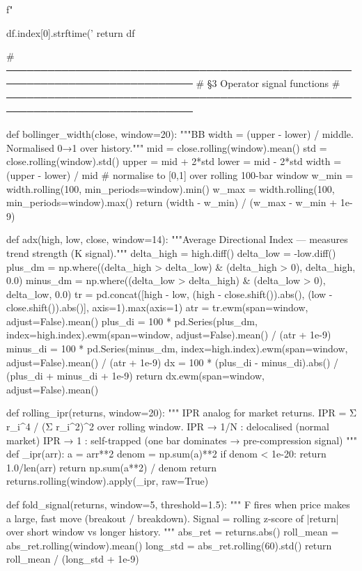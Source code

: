           f"{df.index[0].strftime('%
    return df

# ─────────────────────────────────────────────────────────────────────────────
# §3  Operator signal functions
# ─────────────────────────────────────────────────────────────────────────────

def bollinger_width(close, window=20):
    """BB width = (upper - lower) / middle. Normalised 0→1 over history."""
    mid  = close.rolling(window).mean()
    std  = close.rolling(window).std()
    upper = mid + 2*std
    lower = mid - 2*std
    width = (upper - lower) / mid
    # normalise to [0,1] over rolling 100-bar window
    w_min = width.rolling(100, min_periods=window).min()
    w_max = width.rolling(100, min_periods=window).max()
    return (width - w_min) / (w_max - w_min + 1e-9)

def adx(high, low, close, window=14):
    """Average Directional Index — measures trend strength (K signal)."""
    delta_high = high.diff()
    delta_low  = -low.diff()
    plus_dm  = np.where((delta_high > delta_low) & (delta_high > 0), delta_high, 0.0)
    minus_dm = np.where((delta_low > delta_high) & (delta_low > 0), delta_low,  0.0)
    tr = pd.concat([high - low,
                    (high - close.shift()).abs(),
                    (low  - close.shift()).abs()], axis=1).max(axis=1)
    atr     = tr.ewm(span=window, adjust=False).mean()
    plus_di  = 100 * pd.Series(plus_dm,  index=high.index).ewm(span=window, adjust=False).mean() / (atr + 1e-9)
    minus_di = 100 * pd.Series(minus_dm, index=high.index).ewm(span=window, adjust=False).mean() / (atr + 1e-9)
    dx = 100 * (plus_di - minus_di).abs() / (plus_di + minus_di + 1e-9)
    return dx.ewm(span=window, adjust=False).mean()

def rolling_ipr(returns, window=20):
    """
    IPR analog for market returns.
    IPR = Σ r_i^4 / (Σ r_i^2)^2 over rolling window.
    IPR → 1/N : delocalised (normal market)
    IPR → 1   : self-trapped (one bar dominates → pre-compression signal)
    """
    def _ipr(arr):
        a = arr**2
        denom = np.sum(a)**2
        if denom < 1e-20:
            return 1.0/len(arr)
        return np.sum(a**2) / denom
    return returns.rolling(window).apply(_ipr, raw=True)

def fold_signal(returns, window=5, threshold=1.5):
    """
    F fires when price makes a large, fast move (breakout / breakdown).
    Signal = rolling z-score of |return| over short window vs longer history.
    """
    abs_ret  = returns.abs()
    roll_mean = abs_ret.rolling(window).mean()
    long_std  = abs_ret.rolling(60).std()
    return roll_mean / (long_std + 1e-9)

}
